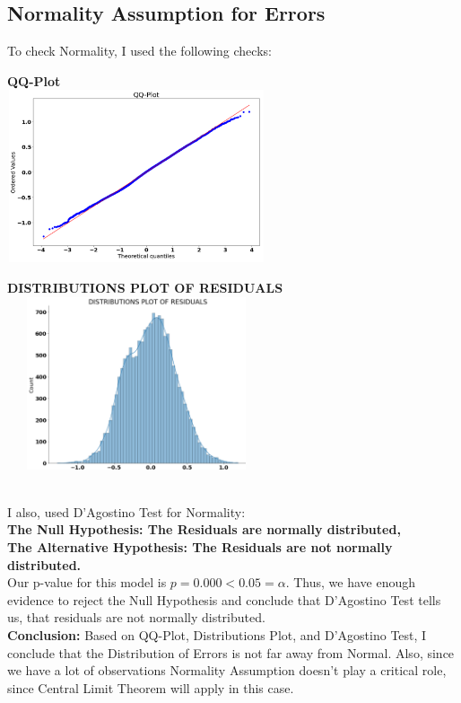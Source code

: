 \documentclass[10pt]{article}
\begin{document}
\subsection*{Normality Assumption for Errors}
To check Normality, I used the following checks:\\
\begin{minipage}{0.5\textwidth}
\begin{center}
	\textbf{QQ-Plot}\\
	\includegraphics[width=3in,height=2in]{qq_plot_multi_model}
\end{center}%
\end{minipage}%
\begin{minipage}{0.5\textwidth}
	\begin{center}
		\textbf{DISTRIBUTIONS PLOT OF RESIDUALS}\\
		\includegraphics[width=3in,height=2in]{dist_plot_resid_multi_model}
	\end{center}%
\end{minipage}%
\\
I also, used D'Agostino Test for Normality:\\
\textbf{The Null Hypothesis:  The Residuals are normally distributed,\\
	The Alternative Hypothesis:  The Residuals are not normally distributed.}\\
Our p-value for this model is \(p=0.000 < 0.05 = \alpha\). Thus, we have enough evidence to reject the Null Hypothesis and conclude that D'Agostino Test tells us, that residuals are not normally distributed.\\
\vskip 0.1in
\noindent
\textbf{Conclusion:} Based on QQ-Plot, Distributions Plot, and D'Agostino Test, I conclude that the Distribution of Errors is not far away from Normal. Also, since we have a lot of observations Normality Assumption doesn't play a critical role, since Central Limit Theorem will apply in this case.
\end{document}
